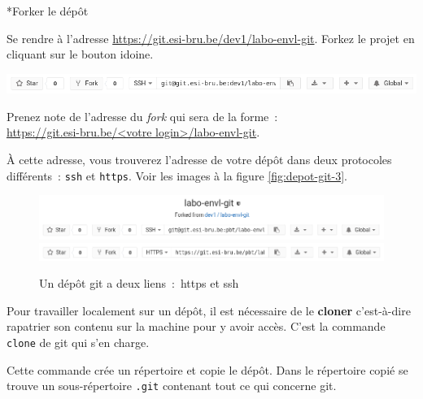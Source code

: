 \documentclass[a4paper,11pt]{style-esi/td}
\begin{document}
\begin{Exercice}*{Forker le dépôt}
	\begin{steps}

	\item Se rendre à l'adresse 
	\url{https://git.esi-bru.be/dev1/labo-envl-git}. Forkez le projet en cliquant
	sur le bouton idoine.
	\begin{center}
	\includegraphics[width=\linewidth]{img/depot-git-2.png}
	\end{center}
	
	\item Prenez note de l'adresse du \textit{fork} qui sera de la forme~:\\
	\url{https://git.esi-bru.be/<votre login>/labo-envl-git}.

	À cette adresse, vous trouverez l'adresse de votre dépôt dans deux
	protocoles différents~: \texttt{ssh} et \texttt{https}. Voir les images à la 
	figure \vref{fig:depot-git-3}.

	\begin{figure}[h]
		\centering
		\includegraphics[width=\linewidth]{img/depot-git-fork-1.png}
		\includegraphics[width=\linewidth]{img/depot-git-fork-2.png}
		\caption{Un dépôt git a deux liens : https et ssh}
		\label{fig:depot-git-3}
	\end{figure}

	\end{steps}
\end{Exercice}

Pour travailler localement sur un dépôt, il est nécessaire de le \textbf{cloner}
c'est-à-dire rapatrier son contenu sur la machine pour y avoir accès. 
C'est la commande \texttt{clone} de git qui s'en charge. 

Cette commande crée un répertoire et copie le dépôt. Dans le répertoire copié
se trouve un sous-répertoire \texttt{.git} contenant tout ce qui concerne git. 
\end{document}
